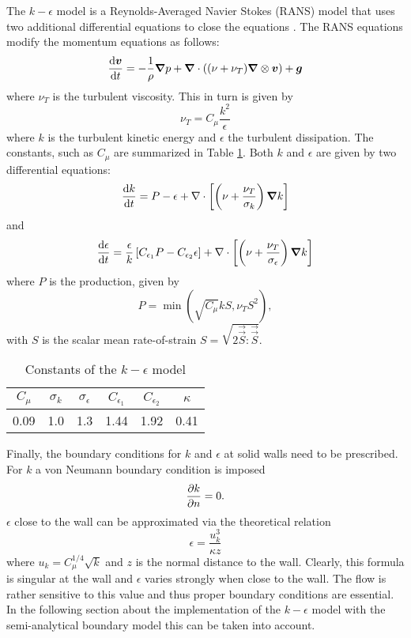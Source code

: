 The $k-\epsilon$ model is a Reynolds-Averaged Navier Stokes (RANS) model that
uses two additional differential equations to close the equations
\cite{pope_turbulent_2001}. The RANS equations modify the momentum
equations as follows:
\begin{equation}
\frac{\text{d} \bm{v}}{\text{d} t} = - \frac{1}{\rho}\bm{\nabla} p + \bm{\nabla} \cdot ( (\nu +
\nu_T) \bm{\nabla} \otimes \bm{v}) + \bm{g}
\label{e:turb:ns}
\end{equation}
where $\nu_T$ is the turbulent viscosity. This in turn is given by
\begin{equation}
\nu_T = C_\mu \frac{k^2}{\epsilon}
\label{e:turb:nut}
\end{equation}
where $k$ is the turbulent kinetic energy and $\epsilon$ the turbulent
dissipation. The constants, such as $C_\mu$ are summarized in Table
\ref{tab:turb:consts}. Both $k$ and $\epsilon$ are given by two
differential equations:
\begin{equation}
\frac{\text{d} k}{\text{d} t} = P - \epsilon + \nabla \cdot \left[  \left(\nu +
\frac{\nu_T}{\sigma_k}\right) \bm{\nabla} k\right]
\label{e:turb:k}
\end{equation}
and
\begin{equation}
\frac{\text{d} \epsilon}{\text{d} t} =\frac{\epsilon}{k}\left[ C_{\epsilon_1} P -
C_{\epsilon_2} \epsilon \right]+ \nabla \cdot \left[  \left(\nu +
\frac{\nu_T}{\sigma_\epsilon}\right) \bm{\nabla} k\right]
\label{e:turb:eps}
\end{equation}
where $P$ is the production, given by
\begin{equation}
P = \min(\sqrt{C_\mu} k S, \nu_T S^2),
\label{e:turb:strain}
\end{equation}
with $S$ is the scalar mean rate-of-strain $S = \sqrt{2 \vec{\vec{S}}
: \vec{\vec{S}}}$.
\begin{table}
\centering
\begin{tabular}{| c | c | c | c | c | c |}
\hline
$C_\mu$ & $\sigma_k$ & $\sigma_\epsilon$ & $C_{\epsilon_1}$ &
$C_{\epsilon_2}$ & $\kappa$
\\
\hline
0.09 & 1.0 & 1.3 & 1.44 & 1.92 & 0.41
\\
\hline
\end{tabular}
\caption{Constants of the $k-\epsilon$ model}
\label{tab:turb:consts}
\end{table}
Finally, the boundary conditions for $k$ and $\epsilon$ at solid walls
need to be prescribed. For $k$ a von Neumann boundary condition is
imposed
\begin{equation}
\frac{\partial k}{\partial n} = 0.
\label{e:turb:k-bound}
\end{equation}
$\epsilon$ close to the wall can be approximated via the theoretical
relation
\begin{equation}
\epsilon = \frac{u_k^3}{\kappa z}
\label{e:turb:eps-nearwall}
\end{equation}
where $u_k = C_\mu^{1/4} \sqrt{k}$ and $z$ is the normal distance to the
wall. Clearly, this formula is singular at the wall and $\epsilon$
varies strongly when close to the wall. The flow is rather sensitive to
this value and thus proper boundary conditions are essential. In the
following section about the implementation of the $k-\epsilon$ model
with the semi-analytical boundary model this can be taken into account.

